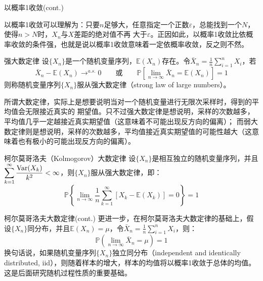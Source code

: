 \documentclass[t]{beamer}
\renewcommand{\Pr}{\mathbb{P}}
\newcommand{\E}{\mathbb{E}}
\newcommand{\Var}{{\rm Var}}
\begin{document}
  \begin{frame}{以概率1收敛(cont.)}
    \begin{block}{}
      以概率1收敛可以理解为：只要$n$足够大，任意指定一个正数$\varepsilon$，总能找到一个$N$，使得$n>N$时，$X_n$与$X$差距的绝对值不再
大于$\varepsilon$。正因如此，以概率1收敛比依概率收敛的条件强，也就是说以概率1收敛意味着一定依概率收敛，反之则不然。
    \end{block}
  \end{frame}
  
  \begin{frame}{强大数定律}
    设$\{X_n\}$是一个随机变量序列，$\E(X_n)$存在。令$\bar
    X_n=\displaystyle\frac{1}{n}\sum^n_{i=1}X_i$，若
    \[\bar X_n-\E(X_n)\mathop{\longrightarrow}^{a.s.} 0\qquad
    \text{或}\qquad \Pr\left[\lim_{n\to\infty}\bar
    X_n=\E(X_n)\right]=1 \]
    则称随机变量序列$\{X_n\}$服从强大数定律（strong law of large numbers）。
  
\begin{block}{}
  所谓大数定律，实际上是想要说明当对一个随机变量进行无限次采样时，得到的平均值会无限接近真实的
期望值。只不过强大数定律是想说明，采样的次数越多，平均值几乎一定越接近真实期望值（这意味着不可能出现反方向的偏离）；
而弱大数定律则是想说明，采样的次数越多，平均值接近真实期望值的可能性越大（这意味着也有极小的可能出现反方向的偏离）。
\end{block}

  \end{frame}



 


  \begin{frame}{柯尔莫哥洛夫（Kolmogorov）大数定律}
    设$\{X_n\}$是相互独立的随机变量序列，并且$\displaystyle\sum^{\infty}_{k=1}\frac{\Var(X_k)}{k^2}<\infty$，则$\{X_n\}$服从强大数定律，即：
    \[\Pr\left\{\lim_{n\to\infty}\frac{1}{n}\sum^{\infty}_{k=1}[X_k-\E(X_k)]=0
    \right\}=1 \]
  \end{frame}



 


  \begin{frame}{柯尔莫哥洛夫大数定律(cont.)}
    更进一步，在柯尔莫哥洛夫大数定律的基础上，假设$\{X_n\}$同分布，并且$\E(X_n)=\mu$，令$\bar
X_n=\displaystyle\frac{1}{n}\sum^n_{i=1}X_i$，则：
\[\Pr\left(\lim_{n\to\infty} \bar X_n=\mu  \right)=1 \]
换句话说，如果随机变量序列$\{X_n\}$独立同分布（independent and identically
distributed, iid），则随着样本的增大，样本的均值将以概率1收敛于总体的均值。
这是后面研究随机过程性质的重要基础。
  \end{frame}
  
\end{document}
